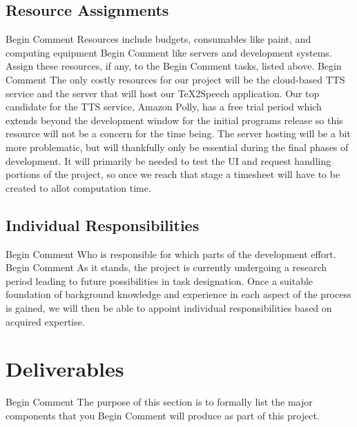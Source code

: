 \documentclass[letterpaper,12pt]{article}
\begin{document}
\subsection{Resource Assignments}
Begin Comment  Resources include budgets, consumables like paint, and computing equipment
Begin Comment  like servers and development systems.  Assign these resources, if any, to the
Begin Comment  tasks, listed above. 
Begin Comment 
The only costly resources for our project will be the cloud-based TTS service and the server that will host our \TeX 2Speech application. Our top candidate for the TTS service, Amazon Polly, has a free trial period which extends beyond the development window for the initial programs release so this resource will not be a concern for the time being. The server hosting will be a bit more problematic, but will thankfully only be essential during the final phases of development. It will primarily be needed to test the UI and request handling portions of the project, so once we reach that stage a timesheet will have to be created to allot computation time.
\subsection{Individual Responsibilities}
Begin Comment  Who is responsible for which parts of the development effort.
Begin Comment 
As it stands, the project is currently undergoing a research period leading to future possibilities in task designation. Once a suitable foundation of background knowledge and experience in each aspect of the process is gained, we will then be able to appoint individual responsibilities based on acquired expertise.
\section{Deliverables}
Begin Comment  The purpose of this section is to formally list the major components that you
Begin Comment  will produce as part of this project.  
\end{document}
